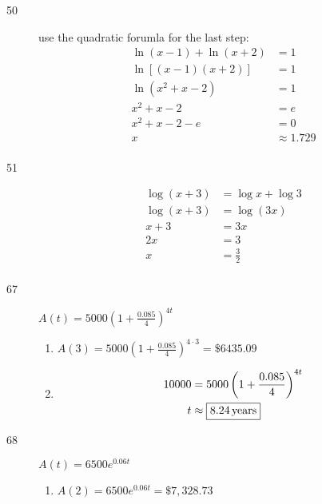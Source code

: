 \documentclass{exam}
\begin{document}
\begin{description}
      \item[50] 
        use the quadratic forumla for the last step:
        \begin{align*}
          \ln(x - 1) + \ln(x + 2)        & = 1 \\
          \ln [(x - 1)(x + 2)]           & = 1 \\
          \ln \left( x^2 + x - 2 \right) & = 1 \\
           x^2 + x - 2                   & = e \\
           x^2 + x - 2 - e               & = 0 \\
           x                             & \approx \boxed{1.729} \\
        \end{align*}

      \item[51] 
        \begin{align*}
          \log (x + 3) &= \log x + \log 3 \\
          \log (x + 3) &= \log (3x) \\
           x + 3       &= 3x \\
           2x          &= 3 \\
           x           &= \boxed{\frac{3}{2}} \\
        \end{align*}

      \item[67]
        $A(t) = 5000 \left( 1 + \frac{0.085}{4} \right)^{4t}$

        \begin{enumerate}[a]
          \item $A(3) = 5000 \left( 1 + \frac{0.085}{4} \right)^{4 \cdot 3} = \boxed{ \$6435.09 }$

          \item
            \begin{align*}
              10000 & = 5000 \left( 1 + \frac{0.085}{4} \right)^{4t} \\
              t     & \approx \boxed{\unit[8.24]{years}} \\
            \end{align*}
        \end{enumerate}

      \pagebreak

      \item[68]
        $A(t) = 6500 e^{0.06 t}$

        \begin{enumerate}[a]
          \item $A(2) = 6500 e^{0.06 t} = \boxed{\$7,328.73}$


\end{enumerate}
\end{description}
\end{document}
